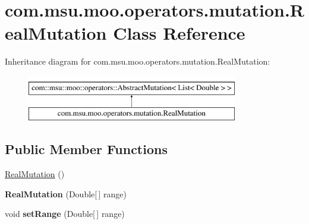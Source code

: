 \hypertarget{classcom_1_1msu_1_1moo_1_1operators_1_1mutation_1_1RealMutation}{\section{com.\-msu.\-moo.\-operators.\-mutation.\-Real\-Mutation Class Reference}
\label{classcom_1_1msu_1_1moo_1_1operators_1_1mutation_1_1RealMutation}
}
Inheritance diagram for com.\-msu.\-moo.\-operators.\-mutation.\-Real\-Mutation\-:\begin{figure}[H]
\begin{center}
\leavevmode
\includegraphics[height=2.000000cm]{classcom_1_1msu_1_1moo_1_1operators_1_1mutation_1_1RealMutation}
\end{center}
\end{figure}
\subsection*{Public Member Functions}
\begin{DoxyCompactItemize}
\item 
\hyperlink{classcom_1_1msu_1_1moo_1_1operators_1_1mutation_1_1RealMutation_a18bba16fa64c7035f702aa45b79fc9d5}{Real\-Mutation} ()
\item 
\hypertarget{classcom_1_1msu_1_1moo_1_1operators_1_1mutation_1_1RealMutation_abac684c5f72a41d9f57c6af409445717}{{\bfseries Real\-Mutation} (Double\mbox{[}$\,$\mbox{]} range)}\label{classcom_1_1msu_1_1moo_1_1operators_1_1mutation_1_1RealMutation_abac684c5f72a41d9f57c6af409445717}

\item 
\hypertarget{classcom_1_1msu_1_1moo_1_1operators_1_1mutation_1_1RealMutation_a507a1e592293383795ba61f0bd9e416a}{void {\bfseries set\-Range} (Double\mbox{[}$\,$\mbox{]} range)}\label{classcom_1_1msu_1_1moo_1_1operators_1_1mutation_1_1RealMutation_a507a1e592293383795ba61f0bd9e416a}

\end{DoxyCompactItemize}

